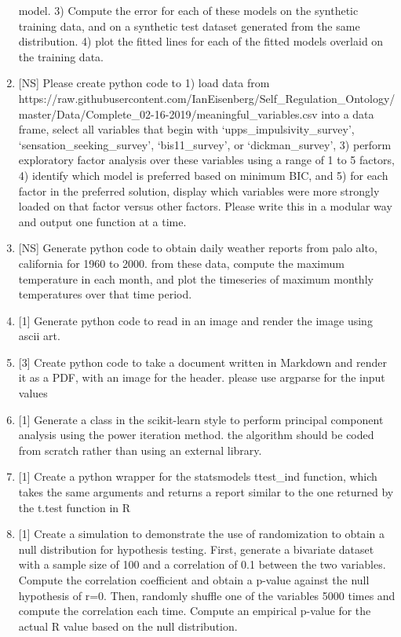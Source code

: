 \documentclass[
]{article}
\begin{document}
\begin{enumerate}
  model. 3) Compute the error for each of these models on the synthetic
  training data, and on a synthetic test dataset generated from the same
  distribution. 4) plot the fitted lines for each of the fitted models
  overlaid on the training data.
\item
  {[}NS{]} Please create python code to 1) load data from
  https://raw.githubusercontent.com/IanEisenberg/Self\_Regulation\_Ontology/master/Data/Complete\_02-16-2019/meaningful\_variables.csv
  into a data frame, select all variables that begin with
  `upps\_impulsivity\_survey', `sensation\_seeking\_survey',
  `bis11\_survey', or `dickman\_survey', 3) perform exploratory factor
  analysis over these variables using a range of 1 to 5 factors, 4)
  identify which model is preferred based on minimum BIC, and 5) for
  each factor in the preferred solution, display which variables were
  more strongly loaded on that factor versus other factors. Please write
  this in a modular way and output one function at a time.
\item
  {[}NS{]} Generate python code to obtain daily weather reports from
  palo alto, california for 1960 to 2000. from these data, compute the
  maximum temperature in each month, and plot the timeseries of maximum
  monthly temperatures over that time period.
\item
  {[}1{]} Generate python code to read in an image and render the image
  using ascii art.
\item
  {[}3{]} Create python code to take a document written in Markdown and
  render it as a PDF, with an image for the header. please use argparse
  for the input values
\item
  {[}1{]} Generate a class in the scikit-learn style to perform
  principal component analysis using the power iteration method. the
  algorithm should be coded from scratch rather than using an external
  library.
\item
  {[}1{]} Create a python wrapper for the statsmodels ttest\_ind
  function, which takes the same arguments and returns a report similar
  to the one returned by the t.test function in R
\item
  {[}1{]} Create a simulation to demonstrate the use of randomization to
  obtain a null distribution for hypothesis testing. First, generate a
  bivariate dataset with a sample size of 100 and a correlation of 0.1
  between the two variables. Compute the correlation coefficient and
  obtain a p-value against the null hypothesis of r=0. Then, randomly
  shuffle one of the variables 5000 times and compute the correlation
  each time. Compute an empirical p-value for the actual R value based
  on the null distribution.
\end{enumerate}
\end{document}
